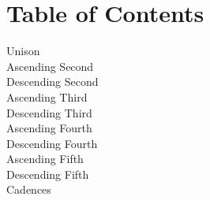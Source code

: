 \clearpage
\section*{Table of Contents}


\noindent

Unison \dotfill \pageref{unison} \\
Ascending Second \dotfill \pageref{ascending_second} \\
Descending Second \dotfill \pageref{descending_second} \\
Ascending Third \dotfill \pageref{ascending_third} \\
Descending Third \dotfill \pageref{descending_third} \\
Ascending Fourth \dotfill \pageref{ascending_fourth} \\
Descending Fourth \dotfill \pageref{descending_fourth} \\
Ascending Fifth \dotfill \pageref{ascending_fifth} \\
Descending Fifth \dotfill \pageref{descending_fifth} \\
Cadences \dotfill \pageref{cadences} 
